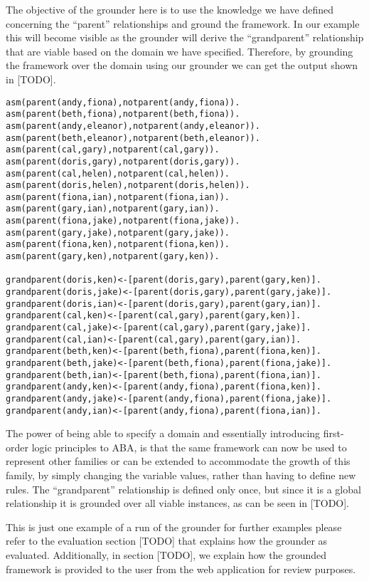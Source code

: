 The objective of the grounder here is to use the knowledge we have defined concerning the ``parent'' relationships and ground the framework. In our example this will become visible as the grounder will derive the ``grandparent'' relationship that are viable based on the domain we have specified. Therefore, by grounding the framework over the domain using our grounder we can get the output shown in [TODO].

\begin{Verbatim}[frame=single]
asm(parent(andy,fiona),notparent(andy,fiona)).
asm(parent(beth,fiona),notparent(beth,fiona)).
asm(parent(andy,eleanor),notparent(andy,eleanor)).
asm(parent(beth,eleanor),notparent(beth,eleanor)).
asm(parent(cal,gary),notparent(cal,gary)).
asm(parent(doris,gary),notparent(doris,gary)).
asm(parent(cal,helen),notparent(cal,helen)).
asm(parent(doris,helen),notparent(doris,helen)).
asm(parent(fiona,ian),notparent(fiona,ian)).
asm(parent(gary,ian),notparent(gary,ian)).
asm(parent(fiona,jake),notparent(fiona,jake)).
asm(parent(gary,jake),notparent(gary,jake)).
asm(parent(fiona,ken),notparent(fiona,ken)).
asm(parent(gary,ken),notparent(gary,ken)).

grandparent(doris,ken)<-[parent(doris,gary),parent(gary,ken)].
grandparent(doris,jake)<-[parent(doris,gary),parent(gary,jake)].
grandparent(doris,ian)<-[parent(doris,gary),parent(gary,ian)].
grandparent(cal,ken)<-[parent(cal,gary),parent(gary,ken)].
grandparent(cal,jake)<-[parent(cal,gary),parent(gary,jake)].
grandparent(cal,ian)<-[parent(cal,gary),parent(gary,ian)].
grandparent(beth,ken)<-[parent(beth,fiona),parent(fiona,ken)].
grandparent(beth,jake)<-[parent(beth,fiona),parent(fiona,jake)].
grandparent(beth,ian)<-[parent(beth,fiona),parent(fiona,ian)].
grandparent(andy,ken)<-[parent(andy,fiona),parent(fiona,ken)].
grandparent(andy,jake)<-[parent(andy,fiona),parent(fiona,jake)].
grandparent(andy,ian)<-[parent(andy,fiona),parent(fiona,ian)].
\end{Verbatim}

The power of being able to specify a domain and essentially introducing first-order logic principles to ABA, is that the same framework can now be used to represent other families or can be extended to accommodate the growth of this family, by simply changing the variable values, rather than having to define new rules. The ``grandparent'' relationship is defined only once, but since it is a global relationship it is grounded over all viable instances, as can be seen in [TODO].

This is just one example of a run of the grounder for further examples please refer to the evaluation section [TODO] that explains how the grounder as evaluated. Additionally, in section [TODO], we explain how the grounded framework is provided to the user from the web application for review purposes.

